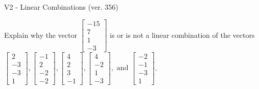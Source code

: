 \begin{exercise}
  \begin{exerciseTitle}V2 - Linear Combinations (ver. 356)\end{exerciseTitle}
  \begin{exerciseStatement}
    Explain why the vector \(\left[\begin{array}{c}
-15 \\
7 \\
1 \\
-3
\end{array}\right]\)  is or is not a linear 
	combination of the vectors \(\left[\begin{array}{c}
2 \\
-3 \\
-3 \\
1
\end{array}\right] , \left[\begin{array}{c}
-1 \\
2 \\
-2 \\
-2
\end{array}\right] , \left[\begin{array}{c}
4 \\
2 \\
3 \\
-1
\end{array}\right] , \left[\begin{array}{c}
4 \\
-2 \\
1 \\
-3
\end{array}\right] , \text{ and } \left[\begin{array}{c}
-2 \\
-1 \\
-3 \\
1
\end{array}\right]\).
	



\end{exerciseStatement}
\end{exercise}

